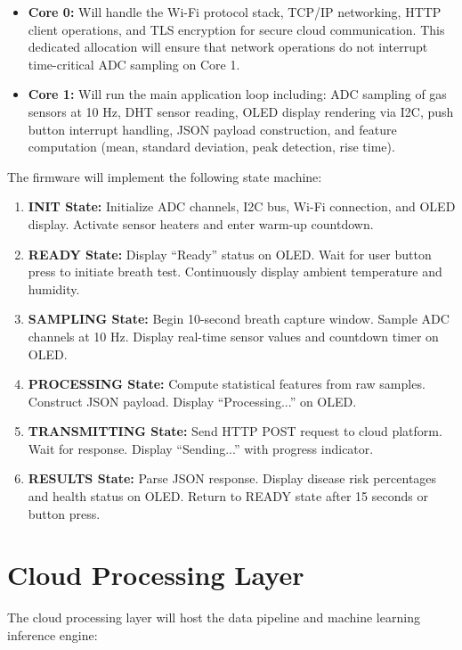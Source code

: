 \begin{itemize}[leftmargin=1.5cm]
\item \textbf{Core 0:} Will handle the Wi-Fi protocol stack, TCP/IP networking, HTTP client operations, and TLS encryption for secure cloud communication. This dedicated allocation will ensure that network operations do not interrupt time-critical ADC sampling on Core 1.

\item \textbf{Core 1:} Will run the main application loop including: ADC sampling of gas sensors at 10 Hz, DHT sensor reading, OLED display rendering via I2C, push button interrupt handling, JSON payload construction, and feature computation (mean, standard deviation, peak detection, rise time).
\end{itemize}

The firmware will implement the following state machine:

\begin{enumerate}[leftmargin=1.5cm]
\item \textbf{INIT State:} Initialize ADC channels, I2C bus, Wi-Fi connection, and OLED display. Activate sensor heaters and enter warm-up countdown.
\item \textbf{READY State:} Display ``Ready'' status on OLED. Wait for user button press to initiate breath test. Continuously display ambient temperature and humidity.
\item \textbf{SAMPLING State:} Begin 10-second breath capture window. Sample ADC channels at 10 Hz. Display real-time sensor values and countdown timer on OLED.
\item \textbf{PROCESSING State:} Compute statistical features from raw samples. Construct JSON payload. Display ``Processing...'' on OLED.
\item \textbf{TRANSMITTING State:} Send HTTP POST request to cloud platform. Wait for response. Display ``Sending...'' with progress indicator.
\item \textbf{RESULTS State:} Parse JSON response. Display disease risk percentages and health status on OLED. Return to READY state after 15 seconds or button press.
\end{enumerate}

\section{Cloud Processing Layer}
The cloud processing layer will host the data pipeline and machine learning inference engine:

